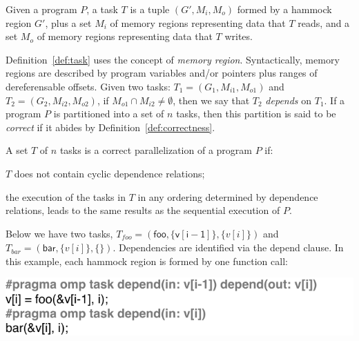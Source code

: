 \documentclass[sigplan,10pt,review,anonymous]{acmart}
\begin{document}
\begin{definition}[Task]
\label{def:task}
Given a program $P$, a task $T$ is a tuple $(G', M_i, M_o)$ formed by a hammock
region $G'$, plus a set $M_i$ of memory regions representing data that $T$ reads,
and a set $M_o$ of memory regions representing data that $T$ writes.
\end{definition}

Definition~\ref{def:task} uses the concept of {\em memory region}.
Syntactically, memory regions are described by program variables and/or pointers
plus ranges of dereferensable offsets.
Given two tasks: $T_1 = (G_1, M_{i1}, M_{o1})$ and $T_2 = (G_2, M_{i2}, M_{o2})$,
if $M_{o1} \cap M_{i2} \neq \emptyset$, then we say that $T_2$ {\em depends} on
$T_1$.
If a program $P$ is partitioned into a set of $n$ tasks, then this partition is
said to be {\em correct} if it abides by Definition~\ref{def:correctness}.

\begin{definition}[Correctness]
\label{def:correctness}
A set $T$ of $n$ tasks is a correct parallelization of a program $P$ if:
\begin{compactenum}
\item $T$ does not contain cyclic dependence relations;
\item the execution of the tasks in $T$ in any ordering determined by dependence
relations, leads to the same results as the sequential execution of $P$.
\end{compactenum}
\end{definition}

\begin{example}
\label{ex:regions}
Below we have two tasks, $T_{\mathit{foo}} = (\mathsf{foo}, \{\mathsf{v[i - 1]}\},
\{v[i]\})$ and $T_{\mathit{bar}} = (\mathsf{bar}, \{v[i]\}, \{\})$.
Dependencies are identified via the \textsf{depend} clause.
In this example, each hammock region is formed by one function call:
\end{example}

\includegraphics[width=1\columnwidth]{images/ex_depends}
\end{document}
